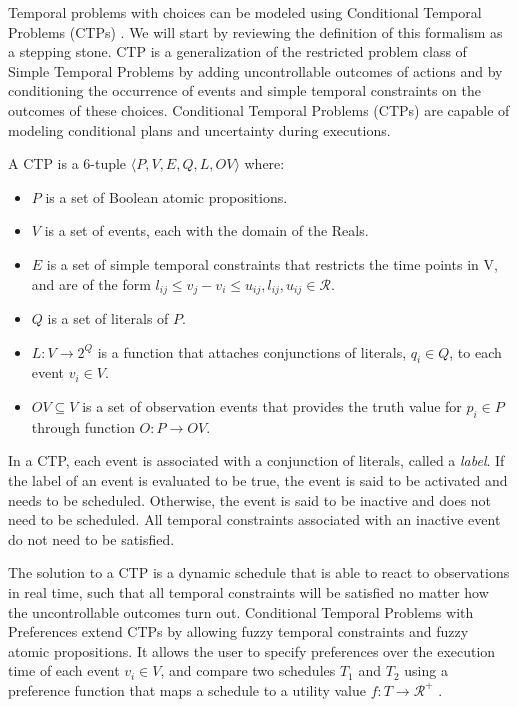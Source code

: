 \documentclass[jair,twoside,11pt,theapa]{article}
\begin{document}
Temporal problems with choices can be modeled using Conditional Temporal
Problems (CTPs) \cite{Tsamardinos_CTP_2003}. We will start by reviewing the definition of this formalism as a stepping stone. CTP is a generalization of the
restricted problem class of Simple Temporal Problems \cite{Dechter_TCN_1991} by
adding uncontrollable outcomes of actions and by conditioning the occurrence of
events and simple temporal constraints on the outcomes of these choices.
Conditional Temporal Problems (CTPs) are capable of modeling conditional plans
and uncertainty during executions.


\begin{mydef}
	
	A CTP is a 6-tuple $\langle P,V,E,Q,L,OV\rangle $ where:
	
	\begin{itemize}

		\item $P$ is a set of Boolean atomic propositions.
		\item $V$ is a set of events, each with the domain of the Reals.
		\item $E$ is a set of simple temporal constraints that restricts the time points in V, and are of the form $l_{ij}\leq v_j-v_i\leq u_{ij},
		l_{ij},u_{ij}\in\mathcal{R}$.
		\item $Q$ is a set of literals of $P$.
		\item $L:V \rightarrow 2^Q$ is a function that attaches conjunctions of
		literals, $q_i\in Q$, to each event $v_i\in V$.
		\item $OV\subseteq V$ is a set of observation events that provides the truth
		value for $p_i\in P$ through function $O:P\rightarrow OV$.
		
	\end{itemize}
\end{mydef}


In a CTP, each event is associated with a conjunction of literals, called a
\textit{label}. If the label of an event is evaluated to be true, the event is
said to be activated and needs to be scheduled. Otherwise, the event is said to
be inactive and does not need to be scheduled. All temporal constraints
associated with an inactive event do not need to be satisfied.


The solution to a CTP is a dynamic schedule that is able to react to
observations in real time, such that all temporal constraints will be satisfied
no matter how the uncontrollable outcomes turn out. Conditional
Temporal Problems with Preferences \cite{Falda07dynamicconsistency}
extend CTPs by allowing fuzzy temporal constraints and fuzzy atomic
propositions. It allows the user to specify preferences over the execution time
of each event $v_i\in V$, and compare two schedules $T_1$ and $T_2$ using a
preference function that maps a schedule to a utility value $f:T\rightarrow
\mathcal{R}^{+}$ \cite{Khatib01temporalconstraint}.
\end{document}
